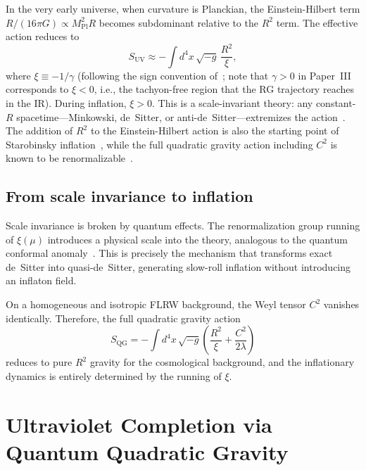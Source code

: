 \documentclass[aps,prd,twocolumn,superscriptaddress,nofootinbib]{revtex4-2}
\begin{document}
In the very early universe, when curvature is Planckian, the Einstein-Hilbert term $R/(16\pi G) \propto M_\mathrm{Pl}^2 R$ becomes subdominant relative to the $R^2$ term. The effective action reduces to
\begin{equation}
S_\mathrm{UV} \approx -\int d^4x\,\sqrt{-g}\,\frac{R^2}{\xi},
\label{eq:pure-r2}
\end{equation}
where $\xi \equiv -1/\gamma$ (following the sign convention of~\cite{LiuQuintinAfshordi2026}; note that $\gamma > 0$ in Paper~III corresponds to $\xi < 0$, i.e., the tachyon-free region that the RG trajectory reaches in the IR). During inflation, $\xi > 0$. This is a scale-invariant theory: any constant-$R$ spacetime---Minkowski, de~Sitter, or anti-de~Sitter---extremizes the action~\cite{Hell2024,Hell2025}. The addition of $R^2$ to the Einstein-Hilbert action is also the starting point of Starobinsky inflation~\cite{Starobinsky1980}, while the full quadratic gravity action including $C^2$ is known to be renormalizable~\cite{Stelle1977}.

\subsection{From scale invariance to inflation}

Scale invariance is broken by quantum effects. The renormalization group running of $\xi(\mu)$ introduces a physical scale into the theory, analogous to the quantum conformal anomaly~\cite{CapperDuff1974,Duff1994}. This is precisely the mechanism that transforms exact de~Sitter into quasi-de~Sitter, generating slow-roll inflation without introducing an inflaton field.

On a homogeneous and isotropic FLRW background, the Weyl tensor $C^2$ vanishes identically. Therefore, the full quadratic gravity action
\begin{equation}
S_\mathrm{QG} = -\int d^4x\,\sqrt{-g}\left(\frac{R^2}{\xi} + \frac{C^2}{2\lambda}\right)
\label{eq:quad-gravity}
\end{equation}
reduces to pure $R^2$ gravity for the cosmological background, and the inflationary dynamics is entirely determined by the running of $\xi$.


\section{Ultraviolet Completion via Quantum Quadratic Gravity}
\label{sec:uv-completion}
\end{document}
